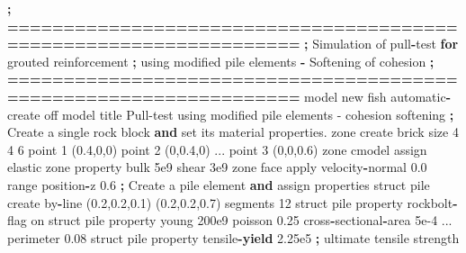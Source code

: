 \documentclass[a4paper, nobind]{templates/ociamthesis}
\newenvironment{Shaded}{\begin{snugshade}}{\end{snugshade}}
\newcommand{\BuiltInTok}[1]{#1}
\newcommand{\ControlFlowTok}[1]{\textcolor[rgb]{0.13,0.29,0.53}{\textbf{#1}}}
\newcommand{\DecValTok}[1]{\textcolor[rgb]{0.00,0.00,0.81}{#1}}
\newcommand{\FloatTok}[1]{\textcolor[rgb]{0.00,0.00,0.81}{#1}}
\newcommand{\KeywordTok}[1]{\textcolor[rgb]{0.13,0.29,0.53}{\textbf{#1}}}
\newcommand{\NormalTok}[1]{#1}
\newcommand{\OperatorTok}[1]{\textcolor[rgb]{0.81,0.36,0.00}{\textbf{#1}}}
\newcommand{\StringTok}[1]{\textcolor[rgb]{0.31,0.60,0.02}{#1}}
\renewenvironment{Shaded}
{
  \vspace{10pt}%
  \begin{snugshade}%
}{%
  \end{snugshade}%
  \vspace{8pt}%
}
\begin{document}
\begin{Shaded}
\begin{Highlighting}[]
    \OperatorTok{;} \OperatorTok{==================================================================}
    \OperatorTok{;}\NormalTok{   Simulation of pull}\OperatorTok{{-}}\NormalTok{test }\ControlFlowTok{for}\NormalTok{ grouted reinforcement}
    \OperatorTok{;}\NormalTok{   using modified pile elements }\OperatorTok{{-}}\NormalTok{ Softening of cohesion}
    \OperatorTok{;} \OperatorTok{==================================================================}
\NormalTok{    model new }
\NormalTok{    fish automatic}\OperatorTok{{-}}\NormalTok{create off}
\NormalTok{    model title }\StringTok{\textquotesingle{}Pull{-}test using modified pile elements {-} cohesion softening\textquotesingle{}}
    \OperatorTok{;}\NormalTok{ Create a single rock block }\KeywordTok{and} \BuiltInTok{set}\NormalTok{ its material properties.}
\NormalTok{    zone create brick size }\DecValTok{4} \DecValTok{4} \DecValTok{6}\NormalTok{ point }\DecValTok{1}\NormalTok{ (}\FloatTok{0.4}\NormalTok{,}\DecValTok{0}\NormalTok{,}\DecValTok{0}\NormalTok{) point }\DecValTok{2}\NormalTok{ (}\DecValTok{0}\NormalTok{,}\FloatTok{0.4}\NormalTok{,}\DecValTok{0}\NormalTok{) ...}
\NormalTok{                                 point }\DecValTok{3}\NormalTok{ (}\DecValTok{0}\NormalTok{,}\DecValTok{0}\NormalTok{,}\FloatTok{0.6}\NormalTok{)}
\NormalTok{    zone cmodel assign elastic}
\NormalTok{    zone }\BuiltInTok{property}\NormalTok{ bulk }\FloatTok{5e9}\NormalTok{ shear }\FloatTok{3e9}
\NormalTok{    zone face }\BuiltInTok{apply}\NormalTok{ velocity}\OperatorTok{{-}}\NormalTok{normal }\FloatTok{0.0} \BuiltInTok{range}\NormalTok{ position}\OperatorTok{{-}}\NormalTok{z }\FloatTok{0.6}
    \OperatorTok{;}\NormalTok{ Create a pile element }\KeywordTok{and}\NormalTok{ assign properties}
\NormalTok{    struct pile create by}\OperatorTok{{-}}\NormalTok{line (}\FloatTok{0.2}\NormalTok{,}\FloatTok{0.2}\NormalTok{,}\FloatTok{0.1}\NormalTok{) (}\FloatTok{0.2}\NormalTok{,}\FloatTok{0.2}\NormalTok{,}\FloatTok{0.7}\NormalTok{) segments }\DecValTok{12}
\NormalTok{    struct pile }\BuiltInTok{property}\NormalTok{ rockbolt}\OperatorTok{{-}}\NormalTok{flag on}
\NormalTok{    struct pile }\BuiltInTok{property}\NormalTok{ young }\FloatTok{200e9}\NormalTok{ poisson }\FloatTok{0.25}\NormalTok{ cross}\OperatorTok{{-}}\NormalTok{sectional}\OperatorTok{{-}}\NormalTok{area }\FloatTok{5e{-}4}\NormalTok{ ...}
\NormalTok{                         perimeter }\FloatTok{0.08}
\NormalTok{    struct pile }\BuiltInTok{property}\NormalTok{ tensile}\OperatorTok{{-}}\ControlFlowTok{yield}   \FloatTok{2.25e5}  \OperatorTok{;}\NormalTok{ ultimate tensile strength}

\end{Highlighting}
\end{Shaded}
\end{document}
